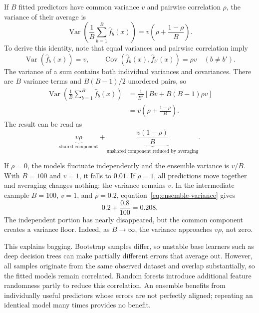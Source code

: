 \documentclass[11pt,a4paper]{article}
\begin{document}
If $B$ fitted predictors have common variance $v$ and pairwise correlation $\rho$, the variance of their average is
\begin{equation}
  \operatorname{Var}\left(\frac{1}{B}\sum_{b=1}^{B}\widehat f_b(x)\right)
  =v\left(\rho+\frac{1-\rho}{B}\right).
  \label{eq:ensemble-variance}
\end{equation}
To derive this identity, note that equal variances and pairwise correlation imply
\begin{equation*}
  \operatorname{Var}(\widehat f_b(x))=v,
  \qquad
  \operatorname{Cov}(\widehat f_b(x),\widehat f_{b'}(x))=\rho v
  \quad (b\neq b').
\end{equation*}
The variance of a sum contains both individual variances and covariances. There are $B$ variance terms and $B(B-1)/2$ unordered pairs, so
\begin{align*}
  \operatorname{Var}\left(\frac{1}{B}\sum_{b=1}^{B}\widehat f_b(x)\right)
  &=\frac{1}{B^2}
    \left[Bv+B(B-1)\rho v\right]\\
  &=v\left(\rho+\frac{1-\rho}{B}\right).
\end{align*}
The result can be read as
\begin{equation}
  \underbrace{v\rho}_{\text{shared component}}
  +
  \underbrace{\frac{v(1-\rho)}{B}}_{\text{unshared component reduced by averaging}}.
\end{equation}

If $\rho=0$, the models fluctuate independently and the ensemble variance is $v/B$. With $B=100$ and $v=1$, it falls to $0.01$. If $\rho=1$, all predictions move together and averaging changes nothing: the variance remains $v$. In the intermediate example $B=100$, $v=1$, and $\rho=0.2$, equation~\eqref{eq:ensemble-variance} gives
\begin{equation*}
  0.2+\frac{0.8}{100}=0.208.
\end{equation*}
The independent portion has nearly disappeared, but the common component creates a variance floor. Indeed, as $B\to\infty$, the variance approaches $v\rho$, not zero.

This explains bagging. Bootstrap samples differ, so unstable base learners such as deep decision trees can make partially different errors that average out. However, all samples originate from the same observed dataset and overlap substantially, so the fitted models remain correlated. Random forests introduce additional feature randomness partly to reduce this correlation. An ensemble benefits from individually useful predictors whose errors are not perfectly aligned; repeating an identical model many times provides no benefit.
\end{document}
